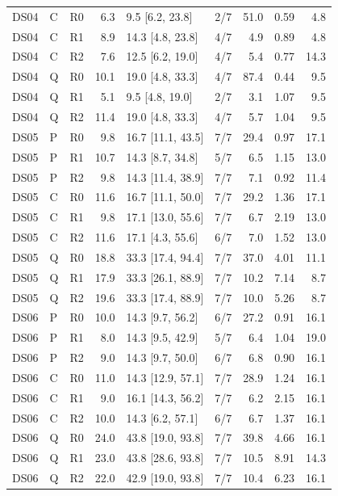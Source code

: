 \documentclass[10pt]{article}
\begin{document}
{\begin{longtable}{lllrlrrrr}
DS04 & C & R0 & 6.3 & 9.5 [6.2, 23.8] & 2/7 & 51.0 & 0.59 & 4.8 \\
DS04 & C & R1 & 8.9 & 14.3 [4.8, 23.8] & 4/7 & 4.9 & 0.89 & 4.8 \\
DS04 & C & R2 & 7.6 & 12.5 [6.2, 19.0] & 4/7 & 5.4 & 0.77 & 14.3 \\
DS04 & Q & R0 & 10.1 & 19.0 [4.8, 33.3] & 4/7 & 87.4 & 0.44 & 9.5 \\
DS04 & Q & R1 & 5.1 & 9.5 [4.8, 19.0] & 2/7 & 3.1 & 1.07 & 9.5 \\
DS04 & Q & R2 & 11.4 & 19.0 [4.8, 33.3] & 4/7 & 5.7 & 1.04 & 9.5 \\
\midrule
DS05 & P & R0 & 9.8 & 16.7 [11.1, 43.5] & 7/7 & 29.4 & 0.97 & 17.1 \\
DS05 & P & R1 & 10.7 & 14.3 [8.7, 34.8] & 5/7 & 6.5 & 1.15 & 13.0 \\
DS05 & P & R2 & 9.8 & 14.3 [11.4, 38.9] & 7/7 & 7.1 & 0.92 & 11.4 \\
DS05 & C & R0 & 11.6 & 16.7 [11.1, 50.0] & 7/7 & 29.2 & 1.36 & 17.1 \\
DS05 & C & R1 & 9.8 & 17.1 [13.0, 55.6] & 7/7 & 6.7 & 2.19 & 13.0 \\
DS05 & C & R2 & 11.6 & 17.1 [4.3, 55.6] & 6/7 & 7.0 & 1.52 & 13.0 \\
DS05 & Q & R0 & 18.8 & 33.3 [17.4, 94.4] & 7/7 & 37.0 & 4.01 & 11.1 \\
DS05 & Q & R1 & 17.9 & 33.3 [26.1, 88.9] & 7/7 & 10.2 & 7.14 & 8.7 \\
DS05 & Q & R2 & 19.6 & 33.3 [17.4, 88.9] & 7/7 & 10.0 & 5.26 & 8.7 \\
\midrule
DS06 & P & R0 & 10.0 & 14.3 [9.7, 56.2] & 6/7 & 27.2 & 0.91 & 16.1 \\
DS06 & P & R1 & 8.0 & 14.3 [9.5, 42.9] & 5/7 & 6.4 & 1.04 & 19.0 \\
DS06 & P & R2 & 9.0 & 14.3 [9.7, 50.0] & 6/7 & 6.8 & 0.90 & 16.1 \\
DS06 & C & R0 & 11.0 & 14.3 [12.9, 57.1] & 7/7 & 28.9 & 1.24 & 16.1 \\
DS06 & C & R1 & 9.0 & 16.1 [14.3, 56.2] & 7/7 & 6.2 & 2.15 & 16.1 \\
DS06 & C & R2 & 10.0 & 14.3 [6.2, 57.1] & 6/7 & 6.7 & 1.37 & 16.1 \\
DS06 & Q & R0 & 24.0 & 43.8 [19.0, 93.8] & 7/7 & 39.8 & 4.66 & 16.1 \\
DS06 & Q & R1 & 23.0 & 43.8 [28.6, 93.8] & 7/7 & 10.5 & 8.91 & 14.3 \\
DS06 & Q & R2 & 22.0 & 42.9 [19.0, 93.8] & 7/7 & 10.4 & 6.23 & 16.1 \\

\end{longtable}}
\end{document}
